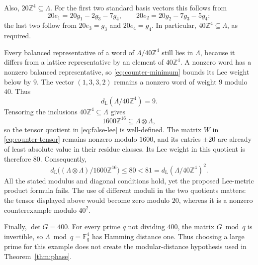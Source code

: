 \documentclass[11pt,letterpaper]{article}
\numberwithin{equation}{section}
\theoremstyle{definition}
\theoremstyle{remark}
\newcommand{\Z}{\mathbb Z}
\newcommand{\F}{\mathbb F}
\begin{document}
Also, $20\Z^4\subseteq\Lambda$. For the first two standard basis vectors this follows from
\[
 20e_1=20g_1-2g_3-7g_4,\qquad
 20e_2=20g_2-7g_3-5g_4;
\]
the last two follow from $20e_3=g_3$ and $20e_4=g_4$. In particular, $40\Z^4\subseteq\Lambda$, as required.

Every balanced representative of a word of $\Lambda/40\Z^4$ still lies in $\Lambda$, because it differs from a lattice representative by an element of $40\Z^4$. A nonzero word has a nonzero balanced representative, so \eqref{eq:counter-minimum} bounds its Lee weight below by $9$. The vector $(1,3,3,2)$ remains a nonzero word of weight $9$ modulo $40$. Thus
\[
 d_{\mathrm L}(\Lambda/40\Z^4)=9.
\]
Tensoring the inclusions $40\Z^4\subseteq\Lambda$ gives
\[
 1600\Z^{16}\subseteq\Lambda\otimes\Lambda,
\]
so the tensor quotient in \eqref{eq:false-lee} is well-defined. The matrix $W$ in \eqref{eq:counter-tensor} remains nonzero modulo $1600$, and its entries $\pm20$ are already of least absolute value in their residue classes. Its Lee weight in this quotient is therefore $80$. Consequently,
\[
 d_{\mathrm L}\bigl((\Lambda\otimes\Lambda)/1600\Z^{16}\bigr)
 \le80<81
 =d_{\mathrm L}(\Lambda/40\Z^4)^2.
\]
All the stated modulus and diagonal conditions hold, yet the proposed Lee-metric product formula fails. The use of different moduli in the two quotients matters: the tensor displayed above would become zero modulo $20$, whereas it is a nonzero counterexample modulo $40^2$.

Finally, $\det G=400$. For every prime $q$ not dividing $400$, the matrix $G\bmod q$ is invertible, so $\Lambda\bmod q=\F_q^4$ has Hamming distance one. Thus choosing a large prime for this example does not create the modular-distance hypothesis used in Theorem~\ref{thm:phase}.
\end{document}
